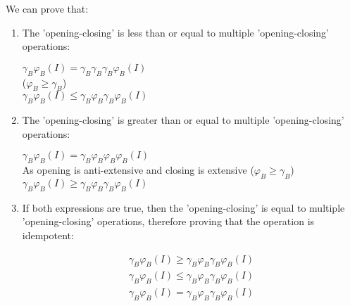 \documentclass[12pt]{article}
\begin{document}
We can prove that:
\begin{enumerate}
  \item The 'opening-closing' is less than or equal to multiple 'opening-closing' operations:
  \begin{center}
  $\gamma_{B} \varphi_{B}(I) = \gamma_{B} \gamma_{B} \gamma_{B} \varphi_{B} (I)$ \\
  ($\varphi_{B} \ge \gamma_{B}$) \\
  $\gamma_{B} \varphi_{B}(I) \le \gamma_{B} \varphi_{B} \gamma_{B} \varphi_{B} (I)$
  \end{center}
  
  \item The 'opening-closing' is greater than or equal to multiple 'opening-closing' operations:
  \begin{center}
  $\gamma_{B} \varphi_{B}(I) = \gamma_{B}  \varphi_{B} \varphi_{B} \varphi_{B} (I)$ \\
  As opening is anti-extensive and closing is extensive ($\varphi_{B} \ge \gamma_{B}$) \\
  $\gamma_{B} \varphi_{B}(I) \ge \gamma_{B} \varphi_{B} \gamma_{B} \varphi_{B} (I)$
  \end{center}
  
  \item If both expressions are true, then the 'opening-closing' is equal to multiple 'opening-closing' operations, therefore proving that the operation is idempotent:
  \begin{center}
  \begin{align} 
  \gamma_{B} \varphi_{B}(I) \ge \gamma_{B} \varphi_{B} \gamma_{B} \varphi_{B} (I) \\
  \gamma_{B} \varphi_{B}(I) \le \gamma_{B} \varphi_{B} \gamma_{B} \varphi_{B} (I) \\
  \gamma_{B} \varphi_{B}(I) = \gamma_{B} \varphi_{B} \gamma_{B} \varphi_{B} (I)
  \end{align}
  \end{center}
\end{enumerate}
\end{document}
